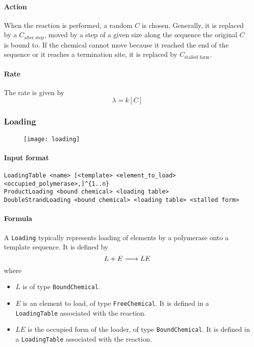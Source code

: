 \paragraph{Action} When the reaction is performed, a random $C$ is chosen. Generally, it is replaced by a $C_\text{after step}$, moved by a step of a given size along the sequence the original $C$ is bound to. If the chemical cannot move because it reached the end of the sequence or it reaches a termination site, it is replaced by $C_\text{stalled form}$.

\paragraph{Rate} The rate is given by
$$
	\lambda = k [C]
$$

\subsubsection{Loading}

\begin{figure}[!ht]
	\centering
	\texttt{[image: loading]}
\end{figure}

\paragraph{Input format}
\begin{verbatim}
LoadingTable <name> [<template> <element_to_load> <occupied_polymerase>,]^{1..n}
ProductLoading <bound chemical> <loading table>
DoubleStrandLoading <bound chemical> <loading table> <stalled form>
\end{verbatim}

\paragraph{Formula} A \texttt{Loading} typically represents loading of elements by a polymerase onto a template sequence. It is defined by
$$
	\reactionIrr{L + E}{LE}{}{}
$$
where
\begin{itemize}
	\item $L$ is of type \texttt{BoundChemical}.
	\item $E$ is an element to load, of type \texttt{FreeChemical}. It is defined in a \texttt{LoadingTable} associated with the reaction.
	\item $LE$ is the occupied form of the loader, of type \texttt{BoundChemical}. It is defined in a \texttt{LoadingTable} associated with the reaction.
\end{itemize}

